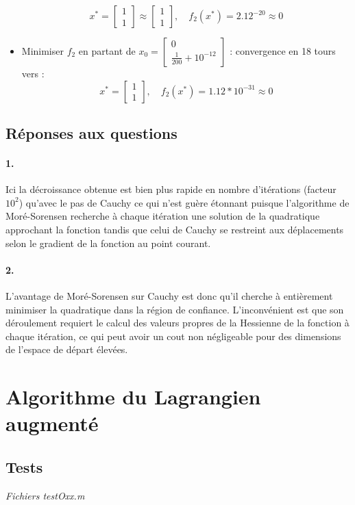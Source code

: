 \documentclass[12pt]{article}	%
\begin{document}
\begin{itemize}
			\[x^* = \left[\begin{array}{c}1\\1\end{array}\right] \approx \left[\begin{array}{c}1\\1\end{array}\right],\quad f_2(x^*) = 2.12^{-20} \approx 0\]
	\item Minimiser $f_2$ en partant de $x_0 = \left[\begin{array}{c}0\\\frac{1}{200} + 10^{-12}\end{array}\right]$ : convergence en 18 tours vers :
			\[x^* = \left[\begin{array}{c}1\\1\end{array}\right],\quad f_2(x^*) = 1.12*10^{-31} \approx 0\]
\end{itemize}

\subsection{Réponses aux questions}
\paragraph{1.}
Ici la décroissance obtenue est bien plus rapide en nombre d'itérations (facteur $10^2$) qu'avec le pas de Cauchy ce qui n'est guère étonnant puisque l'algorithme de Moré-Sorensen recherche à chaque itération une solution de la quadratique approchant la fonction tandis que celui de Cauchy se restreint aux déplacements selon le gradient de la fonction au point courant.

\paragraph{2.}
L'avantage de Moré-Sorensen sur Cauchy est donc qu'il cherche à entièrement minimiser la quadratique dans la région de confiance.
L'inconvénient est que son déroulement requiert le calcul des valeurs propres de la Hessienne de la fonction à chaque itération, ce qui peut avoir un cout non négligeable pour des dimensions de l'espace de départ élevées.

\section{Algorithme du Lagrangien augmenté}
\subsection{Tests}
\begin{flushright}
\textit{Fichiers testOxx.m}
\end{flushright}
\end{document}
